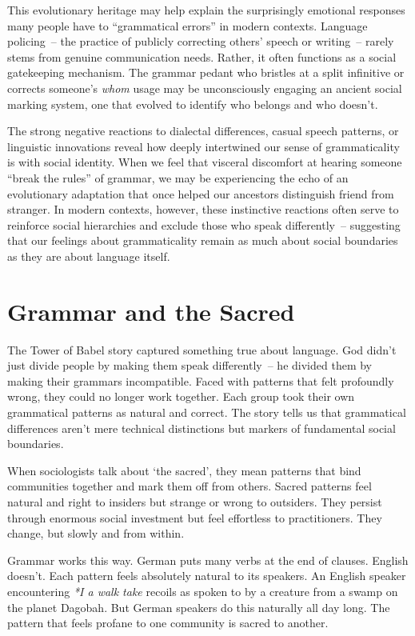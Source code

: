 This evolutionary heritage may help explain the surprisingly emotional responses many people have to ``grammatical errors'' in modern contexts. Language policing~-- the practice of publicly correcting others' speech or writing~-- rarely stems from genuine communication needs. Rather, it often functions as a social gatekeeping mechanism. The grammar pedant who bristles at a split infinitive or corrects someone's \textit{whom} usage may be unconsciously engaging an ancient social marking system, one that evolved to identify who belongs and who doesn't.

The strong negative reactions to dialectal differences, casual speech patterns, or linguistic innovations reveal how deeply intertwined our sense of grammaticality is with social identity. When we feel that visceral discomfort at hearing someone \enquote{break the rules} of grammar, we may be experiencing the echo of an evolutionary adaptation that once helped our ancestors distinguish friend from stranger. In modern contexts, however, these instinctive reactions often serve to reinforce social hierarchies and exclude those who speak differently~-- suggesting that our feelings about grammaticality remain as much about social boundaries as they are about language itself.

\section{Grammar and the Sacred}

The Tower of Babel story captured something true about language. God didn't just divide people by making them speak differently~-- he divided them by making their grammars incompatible. Faced with patterns that felt profoundly wrong, they could no longer work together. Each group took their own grammatical patterns as natural and correct. The story tells us that grammatical differences aren't mere technical distinctions but markers of fundamental social boundaries.

When sociologists talk about `the sacred', they mean patterns that bind communities together and mark them off from others. Sacred patterns feel natural and right to insiders but strange or wrong to outsiders. They persist through enormous social investment but feel effortless to practitioners. They change, but slowly and from within.

Grammar works this way. German puts many verbs at the end of clauses. English doesn't. Each pattern feels absolutely natural to its speakers. An English speaker encountering \textit{*I a walk take} recoils as spoken to by a creature from a swamp on the planet Dagobah. But German speakers do this naturally all day long. The pattern that feels profane to one community is sacred to another.

